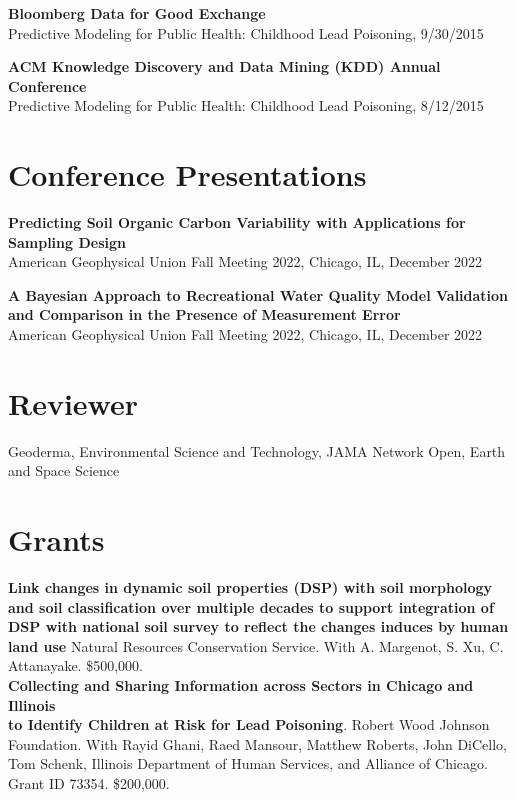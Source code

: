 \documentclass[margin,line]{resume}
\begin{document}
\begin{resume}
	{\bf Bloomberg Data for Good Exchange} \\
        Predictive Modeling for Public Health: Childhood Lead Poisoning, 9/30/2015 

    {\bf ACM Knowledge Discovery and Data Mining (KDD) Annual Conference} \\
        Predictive Modeling for Public Health: Childhood Lead Poisoning, 8/12/2015


    \section{\mysidestyle Conference Presentations}

    {\bf Predicting Soil Organic Carbon Variability with Applications for Sampling Design} \\
        American Geophysical Union Fall Meeting 2022, Chicago, IL, December 2022

    {\bf A Bayesian Approach to Recreational Water Quality Model Validation\\and Comparison in the Presence of Measurement Error}\\
        American Geophysical Union Fall Meeting 2022, Chicago, IL, December 2022

    \section{\mysidestyle Reviewer}
        Geoderma, Environmental Science and Technology, JAMA Network Open, Earth and Space Science \\

	\section{\mysidestyle Grants}

        {\bf Link changes in dynamic soil properties (DSP) with soil morphology and soil classification over multiple decades to support integration of DSP with national soil survey to reflect the changes induces by human land use} Natural Resources Conservation Service. With A. Margenot, S. Xu, C. Attanayake. \$500,000. \\

        {\bf Collecting and Sharing Information across Sectors in Chicago and Illinois\\ to Identify Children at Risk for Lead Poisoning}. Robert Wood Johnson\\ Foundation. With Rayid Ghani, Raed Mansour, Matthew Roberts, John DiCello,\\ Tom Schenk,  Illinois Department of Human Services, and Alliance of Chicago.\\ Grant ID 73354. \$200,000. \\


\end{resume}
\end{document}
